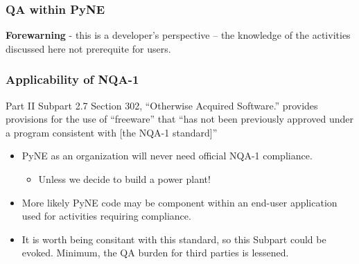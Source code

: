 \documentclass[12pt]{beamer}
\begin{document}
\begin{frame}
\frametitle{QA within PyNE}
{\bf Forewarning} - this is a developer's perspective -- the knowledge of the activities discussed here not prerequite for users.
\end{frame}


\begin{frame}
\frametitle{Applicability of NQA-1}

Part II Subpart 2.7 Section 302, “Otherwise Acquired Software.” provides
provisions for the use of “freeware” that “has not been previously approved
under a program consistent with [the NQA-1 standard]”


\begin{itemize}
\item{PyNE as an organization will never need official NQA-1 compliance.}
    \begin{itemize}
    \item{Unless we decide to build a power plant!}
    \end{itemize}
\item{More likely PyNE code may be component within an end-user application used for activities requiring compliance.}
\item{It is worth being consitant with this standard, so this Subpart could be evoked. Minimum, the QA burden for third parties is lessened.}
\end{itemize}

\end{frame}
\end{document}
